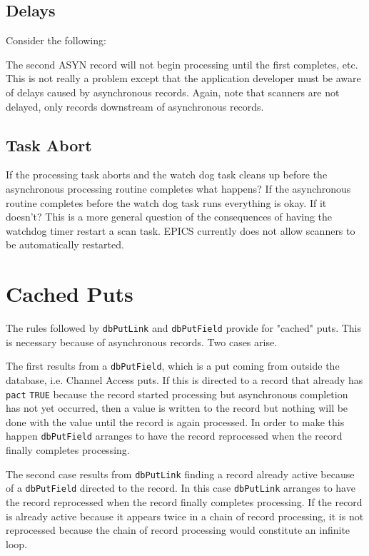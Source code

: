 \subsection{Delays}

Consider the following:

The second ASYN record will not begin processing until the first completes, etc. This is not really a problem except that 
the application developer must be aware of delays caused by asynchronous records. Again, note that scanners are not 
delayed, only records downstream of asynchronous records. 

\subsection{Task Abort}

If the processing task aborts and the watch dog task cleans up before the asynchronous processing routine completes what 
happens? If the asynchronous routine completes before the watch dog task runs everything is okay. If it doesn't? This is a 
more general question of the consequences of having the watchdog timer restart a scan task. EPICS currently does not 
allow scanners to be automatically restarted. 

\section{Cached Puts}

The rules followed by \verb|dbPutLink| and \verb|dbPutField| provide for "cached" puts. This is necessary because of 
asynchronous records. Two cases arise.

The first results from a \verb|dbPutField|, which is a put coming from outside the database, i.e. Channel Access puts. If this 
is directed to a record that already has \verb|pact| \verb|TRUE| because the record started processing but asynchronous completion 
has not yet occurred, then a value is written to the record but nothing will be done with the value until the record is again 
processed. In order to make this happen \verb|dbPutField| arranges to have the record reprocessed when the record finally 
completes processing.

The second case results from \verb|dbPutLink| finding a record already active because of a \verb|dbPutField| directed to the 
record. In this case \verb|dbPutLink| arranges to have the record reprocessed when the record finally completes processing. If 
the record is already active because it appears twice in a chain of record processing, it is not reprocessed because the chain 
of record processing would constitute an infinite loop.

